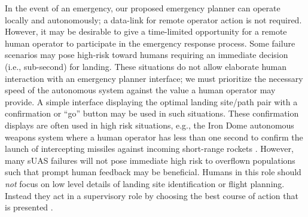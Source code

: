 In the event of an emergency, our proposed emergency planner can operate locally and autonomously; a data-link for remote operator action is not required. However, it may be desirable to give a time-limited opportunity for a remote human operator to participate in the emergency response process. Some failure scenarios may pose high-risk toward humans requiring an immediate decision (i.e., sub-second) for landing. These situations do not allow elaborate human interaction with an emergency planner interface; we must prioritize the necessary speed of the autonomous system against the value a human operator may provide. A simple interface displaying the optimal landing site/path pair with a confirmation or ``go'' button may be used in such situations. These confirmation displays are often used in high risk situations, e.g., the Iron Dome autonomous weapons system where a human operator has less than one second to confirm the launch of intercepting missiles against incoming short-range rockets \cite{docherty2012losing}. However, many \ac{sUAS} failures will not pose immediate high risk to overflown populations such that prompt human feedback may be beneficial. Humans in this role should \emph{not} focus on low level details of landing site identification or flight planning. Instead they act in a supervisory role by choosing the best course of action that is presented \cite{gutzwiller_human-computer_2015}.

